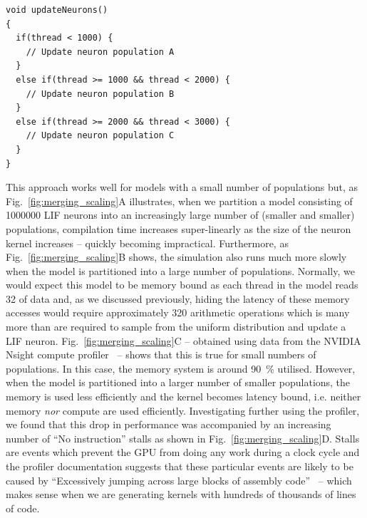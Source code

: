 \documentclass[9pt,twocolumn,twoside,lineno]{pnas-new}
\newcommand{\todo}[1]{\textbf{\textsc{\textcolor{red}{(TODO: #1)}}}}
\begin{document}
\begin{lstlisting}
void updateNeurons()
{
  if(thread < 1000) {
    // Update neuron population A
  }
  else if(thread >= 1000 && thread < 2000) {
    // Update neuron population B
  }
  else if(thread >= 2000 && thread < 3000) {
    // Update neuron population C
  }
}

\end{lstlisting}
%
This approach works well for models with a small number of populations but, as Fig.~\ref{fig:merging_scaling}A illustrates, when we partition a model consisting of \num{1000000} LIF neurons into an increasingly large number of (smaller and smaller) populations, compilation time increases super-linearly as the size of the neuron kernel increases -- quickly becoming impractical.
Furthermore, as Fig.~\ref{fig:merging_scaling}B shows, the simulation also runs much more slowly when the model is partitioned into a large number of populations.
Normally, we would expect this model to be memory bound as each thread in the model reads \SI{32}{\byte} of data and, as we discussed previously, hiding the latency of these memory accesses would require approximately 320 arithmetic operations which is many more than are required to sample from the uniform distribution and update a LIF neuron.
Fig.~\ref{fig:merging_scaling}C -- obtained using data from the NVIDIA Nsight compute profiler~\citep{NVIDIACorporation2020} -- shows that this is true for small numbers of populations.
In this case, the memory system is around \SI{90}{\percent} utilised.
However, when the model is partitioned into a larger number of smaller populations, the memory is used less efficiently and the kernel becomes latency bound, i.e. neither memory \emph{nor} compute are used efficiently.
Investigating further using the profiler, we found that this drop in performance was accompanied by an increasing number of ``No instruction'' stalls as shown in Fig.~\ref{fig:merging_scaling}D.
Stalls are events which prevent the GPU from doing any work during a clock cycle and the profiler documentation suggests that these particular events are likely to be caused by ``Excessively jumping across large blocks of assembly code''~\citep[p47]{NVIDIACorporation2020} -- which makes sense when we are generating kernels with hundreds of thousands of lines of code.
\end{document}
